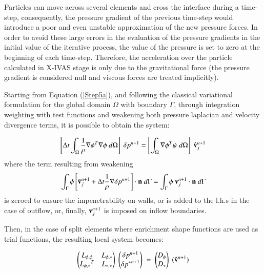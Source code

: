 Particles can move across several elements and cross the interface during a time-step, consequently, the pressure gradient of the previous time-step would introduce a poor and even unstable approximation of the new pressure forces. In order to avoid these large errors in the evaluation of the pressure gradients in the initial value of the iterative process, the value of the pressure is set to zero at the beginning of each time-step. Therefore, the acceleration over the particle calculated in X-IVAS stage is only due to the gravitational force (the pressure gradient is considered null and viscous forces are treated implicitly)\cite{Idelsohn13c}.

Starting from Equation (\ref{Step5a}), and following the classical variational formulation for the global domain $\Omega$ with boundary $\Gamma$, through integration weighting with test functions and weakening both pressure laplacian and velocity divergence terms, it is possible to obtain the system:

\begin{equation}
   \left[\Delta t \int_{\Omega} \frac{1}{\rho} \nabla \phi^T \nabla \phi \ d\Omega\right]\ \delta p^{n+1} = \left[\int_{\Omega} \nabla \phi^T \psi \ d\Omega\right]\ \hat {\mathbf{v}}_j^{n+1}
\label{poisson}
\end{equation}
where the term resulting from weakening
\begin{equation}
\displaystyle \int_{\Gamma} \phi \left[ \hat {\mathbf{v}}_j^{n+1} + \Delta t \frac{1}{\rho} \nabla  \delta p^{n+1} \right] \cdot \mathbf{n} \ d\Gamma = \int_{\Gamma} \phi \ \mathbf{v}_j^{n+1} \cdot \mathbf{n} \ d\Gamma
\end{equation}
 is zeroed to ensure the impenetrability on walls, or is added to the l.h.s in the case of outflow, or, finally, $\mathbf{v}_j^{n+1}$ is imposed on inflow boundaries.

Then, in the case of split elements where enrichment shape functions are used as trial functions, the resulting local system becomes:

  \begin{equation}
  \label{eqsys-poisson}
   \begin{pmatrix}
      L_{\phi,\phi} & L_{\phi,*}\\
      {L_{\phi,*}}^T & L_{*,*}
   \end{pmatrix}\;
    \begin{pmatrix}
      \delta p^{n+1}\\
      \delta {p^*}^{n+1}
   \end{pmatrix}\; = \;
   \begin{pmatrix}
      D_{\phi}\\
      D_*
   \end{pmatrix}\;
   (\hat{\mathbf{v}}^{n+1})
\end{equation}

